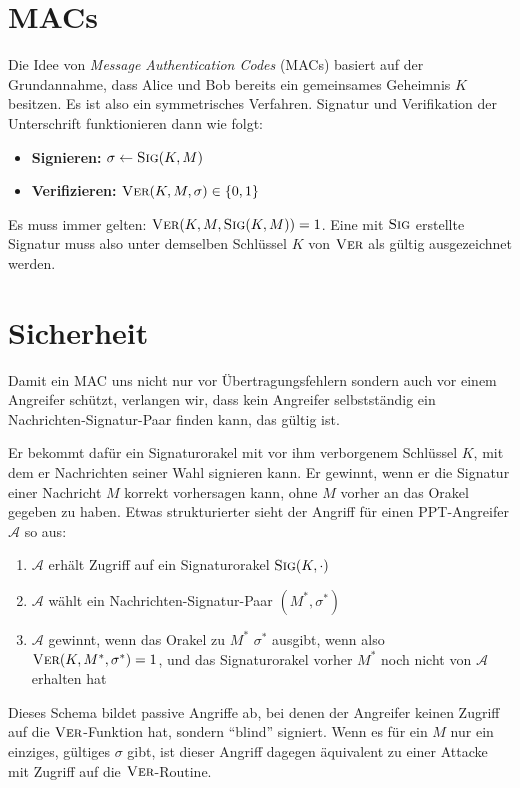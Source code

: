\section{MACs}
Die Idee von \textit{Message Authentication Codes} (MACs) basiert auf der Grundannahme, dass Alice und Bob bereits ein gemeinsames Geheimnis $K$ besitzen. Es
ist also ein symmetrisches Verfahren. Signatur und Verifikation der Unterschrift funktionieren dann wie folgt:
\begin{itemize}
  \item \textbf{Signieren:} $\sigma \leftarrow \textsc{Sig}(K,M)$
  \item \textbf{Verifizieren:} $\textsc{Ver}(K,M,\sigma) \in \{0,1\}$
\end{itemize}
Es muss immer gelten: $\textsc{Ver}(K,M, \textsc{Sig}(K,M)) = 1$. Eine mit $\textsc{Sig}$ erstellte Signatur muss also unter demselben Schlüssel $K$ von $\textsc{Ver}$ als gültig ausgezeichnet
werden.

\section{Sicherheit}
\label{ch:symauth:sicherheit}
Damit ein MAC uns nicht nur vor Übertragungsfehlern sondern auch vor einem Angreifer schützt, verlangen wir, dass kein Angreifer selbstständig ein
Nachrichten-Signatur-Paar finden kann, das gültig ist.

Er bekommt dafür ein Signaturorakel mit vor ihm verborgenem Schlüssel $K$, mit dem er Nachrichten seiner Wahl signieren kann. Er
gewinnt, wenn er die Signatur einer Nachricht $M$ korrekt vorhersagen kann, ohne $M$ vorher an das Orakel gegeben zu haben. Etwas strukturierter sieht der
Angriff für einen PPT-Angreifer $\mathcal{A}$ so aus:
\begin{enumerate}
  \item $\mathcal{A}$ erhält Zugriff auf ein Signaturorakel $\textsc{Sig}(K,\cdot)$
  \item $\mathcal{A}$ wählt ein Nachrichten-Signatur-Paar $(M^*,\sigma^*)$
  \item $\mathcal{A}$ gewinnt, wenn das Orakel zu $M^*$ $\sigma^*$ ausgibt, wenn also $\textsc{Ver}(K,M^*,\sigma^*) = 1$, und das Signaturorakel vorher $M^*$ noch
  nicht von $\mathcal{A}$ erhalten hat
\end{enumerate}
Dieses Schema bildet passive Angriffe ab, bei denen der Angreifer keinen Zugriff auf die $\textsc{Ver}$-Funktion hat, sondern "`blind"' signiert. Wenn es für ein $M$
nur ein einziges, gültiges $\sigma$ gibt, ist dieser Angriff dagegen äquivalent zu einer Attacke mit Zugriff auf die $\textsc{Ver}$-Routine. 

